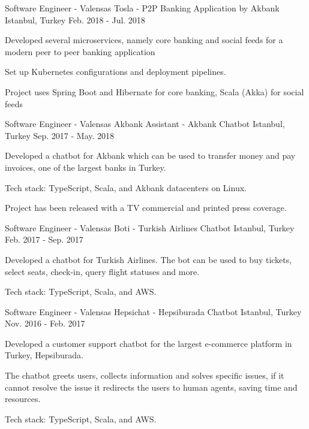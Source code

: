 \begin{cventries}
  \cventry
    {Software Engineer - Valensas}
    {Tosla - P2P Banking Application by Akbank}
    {Istanbul, Turkey}
    {Feb. 2018 - Jul. 2018}
    {
      \begin{cvitems}
        \item {Developed several microservices, namely core banking and social feeds for a modern peer to peer banking application}
        \item {Set up Kubernetes configurations and deployment pipelines.}
        \item {Project uses Spring Boot and Hibernate for core banking, Scala (Akka) for social feeds}
      \end{cvitems}
    } 

  \cventry
    {Software Engineer - Valensas}
    {Akbank Assistant - Akbank Chatbot}
    {Istanbul, Turkey}
    {Sep. 2017 - May. 2018}
    {
      \begin{cvitems}
        \item {Developed a chatbot for Akbank which can be used to transfer money and pay invoices, one of the largest banks in Turkey.}
        \item {Tech stack: TypeScript, Scala, and Akbank datacenters on Linux.}
        \item {Project has been released with a TV commercial and printed press coverage.}
      \end{cvitems}
    }

  \cventry
    {Software Engineer - Valensas}
    {Boti - Turkish Airlines Chatbot}
    {Istanbul, Turkey}
    {Feb. 2017 - Sep. 2017}
    {
      \begin{cvitems}
        \item {Developed a chatbot for Turkish Airlines. The bot can be used to buy tickets, select seats, check-in, query flight statuses and more.}
        \item {Tech stack: TypeScript, Scala, and AWS.}
      \end{cvitems}
    }

  \cventry
    {Software Engineer - Valensas}
    {Hepsichat - Hepsiburada Chatbot}
    {Istanbul, Turkey}
    {Nov. 2016 - Feb. 2017}
    {
      \begin{cvitems}
        \item {Developed a customer support chatbot for the largest e-commerce platform in Turkey, Hepsiburada.}
        \item {The chatbot greets users, collects information and solves specific issues, if it cannot resolve the issue it redirects the users to human agents, saving time and resources.}
        \item {Tech stack: TypeScript, Scala, and AWS.}
      \end{cvitems}
    }


\end{cventries}
